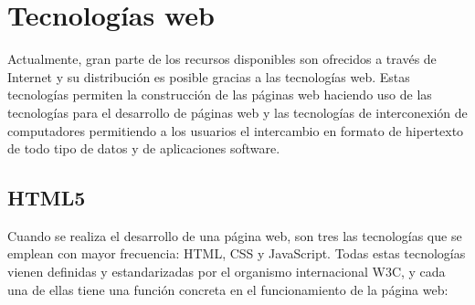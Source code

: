 \section{Tecnologías web}
\label{sec:tecnologias_web}

Actualmente, gran parte de los recursos disponibles son ofrecidos a través de Internet y su distribución es posible gracias a las tecnologías web. Estas tecnologías permiten la construcción de las páginas web haciendo uso de las tecnologías para el desarrollo de páginas web y las tecnologías de interconexión de computadores permitiendo a los usuarios el intercambio en formato de hipertexto de todo tipo de datos y de aplicaciones software.

\subsection{HTML5}
\label{sec:html5}

Cuando se realiza el desarrollo de una página web, son tres las tecnologías que se emplean con mayor frecuencia: HTML, CSS y JavaScript. Todas estas tecnologías vienen definidas y estandarizadas por el organismo internacional W3C, y cada una de ellas tiene una función concreta en el funcionamiento de la página web:

